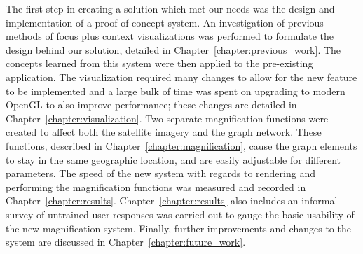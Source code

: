 The first step in creating a solution which met our needs was the design and implementation of a proof-of-concept system. An investigation of previous methods of focus plus context visualizations was performed to formulate the design behind our solution, detailed in Chapter~\ref{chapter:previous_work}. The concepts learned from this system were then applied to the pre-existing application. The visualization required many changes to allow for the new feature to be implemented and a large bulk of time was spent on upgrading to modern OpenGL to also improve performance; these changes are detailed in Chapter~\ref{chapter:visualization}. Two separate magnification functions were created to affect both the satellite imagery and the
graph network. These functions, described in Chapter~\ref{chapter:magnification}, cause the graph elements to stay in the same geographic location, and are easily adjustable for different parameters. The speed of the new system with regards to rendering and performing the magnification functions was measured and recorded in Chapter~\ref{chapter:results}. Chapter~\ref{chapter:results} also includes an informal survey of untrained user responses was carried out to gauge the basic
usability of the new magnification system. Finally, further improvements and changes to the system are discussed in Chapter~\ref{chapter:future_work}.
